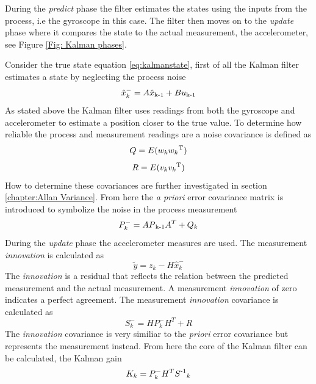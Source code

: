 \documentclass[a4paper,11pt]{kth-mag}
\begin{document}
During the \textit{predict} phase the filter estimates the states using the inputs from the process, i.e the gyroscope in this case. The filter then moves on to the \textit{update} phase where it compares the state to the actual measurement, the accelerometer, see Figure \ref{Fig: Kalman phases}.

Consider the true state equation \eqref{eq:kalmanstate}, first of all the Kalman filter estimates a state by neglecting the process noise
\begin{equation} \label{eq:Kalman first estimate}
\hat{x}^-_k = A\hat{x}\textsubscript{k-1}+Bu\textsubscript{k-1}
\end{equation}
As stated above the Kalman filter uses readings from both the gyroscope and accelerometer to estimate a position closer to the true value. To determine how reliable the process and measurement readings are a noise covariance is defined as
\begin{equation} \label{eq:covariance process noise}
Q = E(w_k w_k \textsuperscript{T})
\end{equation}
\begin{equation} \label{eq:covariance measurement noise}
R = E(v_k v_k \textsuperscript{T} )
\end{equation}
How to determine these covariances are further investigated in section  \ref{chapter:Allan Variance}.
From here the \textit{a priori} error covariance matrix is introduced to symbolize the noise in the process measurement
\begin{equation}
P^-_k = AP\textsubscript{k-1}A^T + Q_k
\end{equation}
During the \textit{update} phase the accelerometer measures are used. The measurement \textit{innovation} is calculated as
\begin{equation} \label{eq: innovation}
\tilde{y} = z_k - H\hat{x}^-_k
\end{equation}
The \textit{innovation} is a residual that reflects the relation between the predicted measurement and the actual measurement. A measurement \textit{innovation} of zero indicates a perfect agreement.
The measurement \textit{innovation} covariance is calculated as
\begin{equation} \label{eq:innovation cov}
S^-_k = HP^-_kH^T + R
\end{equation}
The \textit{innovation} covariance is very similiar to the \textit{priori} error covariance but represents the measurement instead. From here the core of the Kalman filter can be calculated, the Kalman gain
\begin{equation} \label{eq:Kalman gain}
K_k = P^-_kH^TS\textsuperscript{-1}_k
\end{equation}
\end{document}
